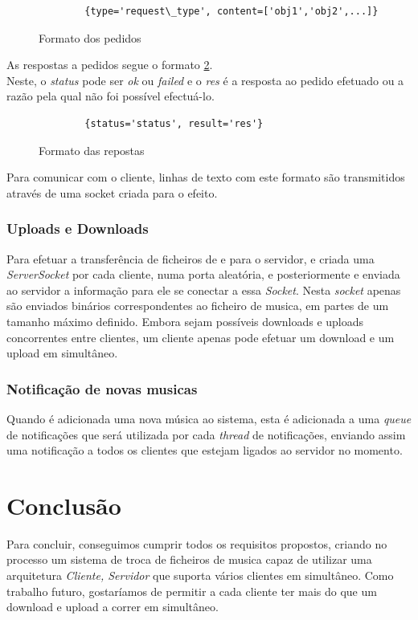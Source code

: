 \documentclass[a4paper]{report}
\begin{document}
\begin{figure}[H]
    \begin{verbatim}
        {type='request\_type', content=['obj1','obj2',...]}
    \end{verbatim}
    \caption{Formato dos pedidos}
    \label{inputformat}
\end{figure}
As respostas a pedidos segue o formato \ref{outputformat}.\\
Neste, o \textit{status} pode ser \textit{ok} ou \textit{failed} e o
\textit{res} é a resposta ao pedido efetuado ou a razão pela qual não foi
possível  efectuá-lo.

\begin{figure}[H]
    \begin{verbatim}
        {status='status', result='res'}
    \end{verbatim}
    \caption{Formato das repostas}
    \label{outputformat}
\end{figure}
Para comunicar com o cliente, linhas de texto com este formato são transmitidos
através de uma socket criada para o efeito.

\subsection{Uploads e Downloads}
Para efetuar a transferência de ficheiros de e para o servidor, e criada uma
\textit{ServerSocket} por cada cliente, numa porta aleatória, e posteriormente
e enviada ao servidor a informação para ele se conectar a essa \textit{Socket}.
Nesta \textit{socket} apenas são enviados binários correspondentes ao ficheiro
de musica, em partes de um tamanho máximo definido. Embora sejam possíveis
downloads e uploads concorrentes entre clientes, um cliente apenas pode efetuar
um download e um upload em simultâneo.

\subsection{Notificação de novas musicas}
Quando é adicionada uma nova música ao sistema, esta é adicionada a uma
\textit{queue} de notificações que será utilizada por cada \textit{thread} de
notificações, enviando assim uma notificação a todos os clientes que estejam
ligados ao servidor no momento.

\chapter{Conclusão}
Para concluir, conseguimos cumprir todos os requisitos propostos, criando no processo um
sistema de troca de ficheiros de musica capaz de utilizar uma arquitetura 
\textit{Cliente, Servidor} que suporta vários clientes em simultâneo.
Como trabalho futuro, gostaríamos de permitir a cada cliente ter mais do que um
download e upload a correr em simultâneo.
\end{document}
